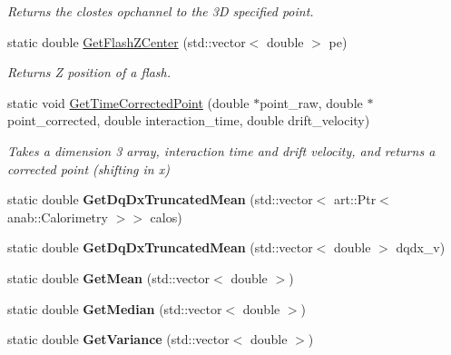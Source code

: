 \begin{DoxyCompactItemize}
\begin{DoxyCompactList}\small\item\em Returns the clostes opchannel to the 3\-D specified point. \end{DoxyCompactList}\item 
static double \hyperlink{classUBXSecHelper_a3fd25ef568b54aded55d6c1b6a8593fa}{Get\-Flash\-Z\-Center} (std\-::vector$<$ double $>$ pe)
\begin{DoxyCompactList}\small\item\em Returns Z position of a flash. \end{DoxyCompactList}\item 
static void \hyperlink{classUBXSecHelper_a44a38546ab8f9a473f0957af008219d4}{Get\-Time\-Corrected\-Point} (double $\ast$point\-\_\-raw, double $\ast$point\-\_\-corrected, double interaction\-\_\-time, double drift\-\_\-velocity)
\begin{DoxyCompactList}\small\item\em Takes a dimension 3 array, interaction time and drift velocity, and returns a corrected point (shifting in x) \end{DoxyCompactList}\item 
\hypertarget{classUBXSecHelper_a1510ec3db42854ce3b6fb6c70b3bdb59}{static double {\bfseries Get\-Dq\-Dx\-Truncated\-Mean} (std\-::vector$<$ art\-::\-Ptr$<$ anab\-::\-Calorimetry $>$$>$ calos)}\label{classUBXSecHelper_a1510ec3db42854ce3b6fb6c70b3bdb59}

\item 
\hypertarget{classUBXSecHelper_a18cdf8228d1a98d4fa953423b8de114c}{static double {\bfseries Get\-Dq\-Dx\-Truncated\-Mean} (std\-::vector$<$ double $>$ dqdx\-\_\-v)}\label{classUBXSecHelper_a18cdf8228d1a98d4fa953423b8de114c}

\item 
\hypertarget{classUBXSecHelper_a7b30d498de5b4468a717f6223e6d43a0}{static double {\bfseries Get\-Mean} (std\-::vector$<$ double $>$)}\label{classUBXSecHelper_a7b30d498de5b4468a717f6223e6d43a0}

\item 
\hypertarget{classUBXSecHelper_a69277b565e667891e4fe820f7beca6cf}{static double {\bfseries Get\-Median} (std\-::vector$<$ double $>$)}\label{classUBXSecHelper_a69277b565e667891e4fe820f7beca6cf}

\item 
\hypertarget{classUBXSecHelper_ab9aa3a755a90de77e5b61412c04206b2}{static double {\bfseries Get\-Variance} (std\-::vector$<$ double $>$)}\label{classUBXSecHelper_ab9aa3a755a90de77e5b61412c04206b2}


\end{DoxyCompactItemize}
